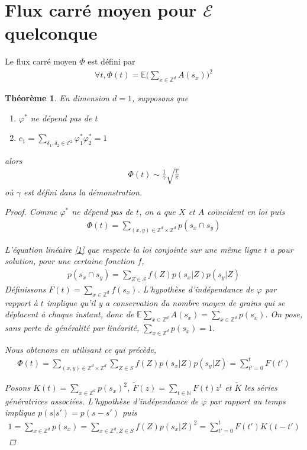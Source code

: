 \documentclass{article}
\newtheorem{theorem}{Théorème}[section]
\begin{document}
\section{Flux carré moyen pour $\mathcal{E}$ quelconque}
Le flux carré moyen $\Phi$ est défini par 
\begin{align*}
	\forall t, \Phi(t) = \mathbb{E}\bigg(\sum_{x\in\mathbb{Z}^d}A(s_x)\bigg)^2 
\end{align*}

\begin{theorem}
	En dimension $d=1$, supposons que \begin{enumerate}
		\item $\varphi^*$ ne dépend pas de $t$
		\item $c_1 = \sum_{\delta_1,\delta_2\in \mathcal{E}^2}\varphi_1^* \varphi_2^* = 1$
	\end{enumerate}
	alors \begin{align*}
		\Phi(t) \sim \frac{1}{\gamma}\sqrt{\frac{t}{\pi}}
	\end{align*}
	où $\gamma$ est défini dans la démonstration.
	\begin{proof}
		Comme $\varphi^*$ ne dépend pas de $t$, on a que $X$ et $A$ coïncident en loi puis \begin{align*}
			\Phi(t) = \sum_{(x,y)\in\mathbb{Z}^d\times\mathbb{Z}^d} p(s_x \cap s_y)
		\end{align*}

		L'équation linéaire \eqref{1} que respecte la loi conjointe sur une même ligne $t$ a pour solution, pour une certaine fonction $f$, 
\begin{align*}
	p(s_x\cap s_y) = \sum_{Z\in \mathcal{S}} f(Z) p(s_x|Z)p(s_y|Z)
\end{align*}
Définissons $F(t) = \sum_{x\in\mathbb{Z}^d}f(s_x)$. L'hypothèse d'indépendance de $\varphi$ par rapport à $t$ implique qu'il y a conservation du nombre moyen de grains qui se déplacent à chaque instant, donc de $\mathbb{E}\sum_{x\in\mathbb{Z}^d}A(s_x)=\sum_{x\in\mathbb{Z}^d}p(s_x)$. On pose, sans perte de généralité par linéarité, $\sum_{x\in\mathbb{Z}^d}p(s_x) = 1$.

Nous obtenons en utilisant ce qui précède,
\begin{align*}
	\Phi(t) = \sum_{(x,y)\in\mathbb{Z}^d\times\mathbb{Z}^d}\sum_{Z\in S} f(Z)p(s_x|Z)p(s_y|Z) = \sum_{t'=0}^t F(t')
\end{align*}

Posons $K(t) = \sum_{x\in\mathbb{Z}^d} p(s_x)^2$, $\tilde{F}(z) = \sum_{t\in \mathbb{N}}F(t) z^t$ et $\tilde{K}$ les séries génératrices associées. L'hypothèse d'indépendance de $\varphi$ par rapport au temps implique $p(s|s')=p(s-s')$ puis
\begin{align*}
	1 = \sum_{x\in\mathbb{Z}^d}p(s_x) = \sum_{x\in\mathbb{Z}^d, Z\in S}f(Z)p(s_x|Z)^2 = \sum_{t'=0}^t F(t')K(t-t')
\end{align*}


\end{proof}
\end{theorem}
\end{document}
